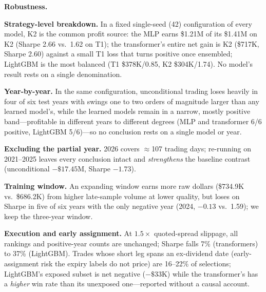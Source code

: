 \documentclass[sigconf,review,anonymous]{acmart}
\begin{document}
\medskip\noindent\textbf{Robustness.}
\label{sec:robustness}

\noindent\textbf{Strategy-level breakdown.} In a fixed single-seed (42) configuration of every model, K2 is the common profit source: the MLP earns \$1.21M of its \$1.41M on K2 (Sharpe 2.66 vs.\ 1.62 on T1); the transformer's entire net gain is K2 (\$717K, Sharpe 2.60) against a small T1 loss that turns positive once ensembled; LightGBM is the most balanced (T1 \$378K/0.85, K2 \$304K/1.74). No model's result rests on a single denomination.

\noindent\textbf{Year-by-year.} In the same configuration, unconditional trading loses heavily in four of six test years with swings one to two orders of magnitude larger than any learned model's, while the learned models remain in a narrow, mostly positive band---profitable in different years to different degrees (MLP and transformer 6/6 positive, LightGBM 5/6)---so no conclusion rests on a single model or year.

\noindent\textbf{Excluding the partial year.} 2026 covers $\approx$107 trading days; re-running on 2021--2025 leaves every conclusion intact and \emph{strengthens} the baseline contrast (unconditional $-\$17.45$M, Sharpe $-1.73$).

\noindent\textbf{Training window.} An expanding window earns more raw dollars (\$734.9K vs.\ \$686.2K) from higher late-sample volume at lower quality, but loses on Sharpe in five of six years with the only negative year (2024, $-0.13$ vs.\ 1.59); we keep the three-year window.

\noindent\textbf{Execution and early assignment.} At $1.5\times$ quoted-spread slippage, all rankings and positive-year counts are unchanged; Sharpe falls 7\% (transformers) to 37\% (LightGBM). Trades whose short leg spans an ex-dividend date (early-assignment risk the expiry labels do not price) are 16--22\% of selections; LightGBM's exposed subset is net negative ($-\$33$K) while the transformer's has a \emph{higher} win rate than its unexposed one---reported without a causal account.
\end{document}
